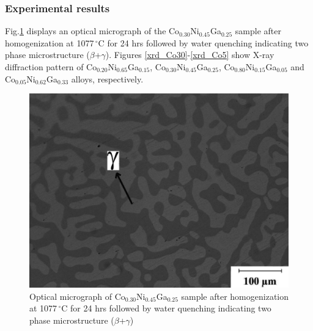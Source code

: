 \documentclass[article]{elsarticle}
\begin{document}
\subsubsection{Experimental results}
Fig.\ref{Opt-Mic} displays an optical micrograph of the Co$_{0.30}$Ni$_{0.45}$Ga$_{0.25}$
sample after homogenization at 1077$\,^{\circ}\mathrm{C}$ for 24 hrs
followed by water quenching indicating two phase microstructure ($\beta$+$\gamma$).
Figures \ref{xrd_Co30}-\ref{xrd_Co5} show X-ray diffraction pattern of Co$_{0.20}$Ni$_{0.65}$Ga$_{0.15}$,
Co$_{0.30}$Ni$_{0.45}$Ga$_{0.25}$, Co$_{0.80}$Ni$_{0.15}$Ga$_{0.05}$ and
Co$_{0.05}$Ni$_{0.62}$Ga$_{0.33}$ alloys, respectively.
\begin{figure}[!htbp]
\centering
\includegraphics[scale=0.35]{CoNiGa_micrograph}
\caption{Optical micrograph of Co$_{0.30}$Ni$_{0.45}$Ga$_{0.25}$ sample after homogenization
at 1077$\,^{\circ}\mathrm{C}$ for 24 hrs followed by water quenching indicating
two phase microstructure ($\beta$+$\gamma$)}
\label{Opt-Mic}
\end{figure}
\end{document}

